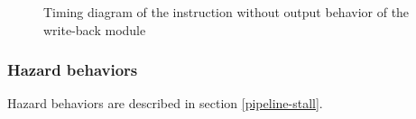 \begin{figure}[H]
    \centering
    
    \caption{Timing diagram of the instruction without output behavior of the write-back module}
    \label{fig:wbm-behavior-instruction-without-output}
\end{figure}

\subsubsection{Hazard behaviors}

\begin{content}
  Hazard behaviors are described in section \ref{pipeline-stall}.
\end{content}

\newpage